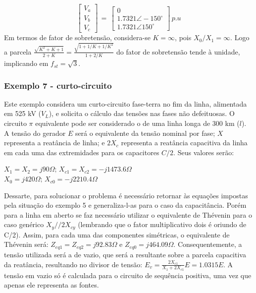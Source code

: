 
\begin{equation} \label{top4:exe6:1}
 \begin{bmatrix} V_a \\ V_b \\ V_c  \end{bmatrix} \,=\, 
 \begin{bmatrix} 0 \\ 1.7321 \angle-150^{\circ} \\ 1.7321 \angle150^{\circ} \end{bmatrix} \, p.u
\end{equation}
Em termos de fator de sobretensão, considera-se $K=\infty$, pois $X_0/X_1=\infty$. Logo a parcela $\frac{\sqrt{K^2+K+1}}{2+K} = \frac{\sqrt{1 + 1/K + 1/K^2}}{1+2/K}$ do fator de sobretensão tende à unidade, implicando em $f_{st} = \sqrt{3}$.

\subsubsection*{Exemplo 7 - curto-circuito}

Este exemplo considera um curto-circuito fase-terra no fim da linha, alimentada em 525 kV ($V_L$), e solicita o cálculo das tensões nas fases não defeituosas. O circuito $\pi$ equivalente pode ser considerado o de uma linha longa de 300 km ($l$). A tensão do gerador $E$ será o equivalente da tensão nominal por fase; $X$ representa a reatância de linha; e $2X_c$ representa a reatância capacitiva da linha em cada uma das extremidades para os capacitores $C/2$. Seus valores serão:
\begin{center}
    $X_1 = X_2 = j90 \Omega; \, X_{c1} = X_{c2} = -j1473.6 \Omega$ \\ \vspace{1pt}
    $X_0 = j420 \Omega; \, X_{c0} = -j2210.4 \Omega$
\end{center}
Dessarte, para solucionar o problema é necessário retornar às equações impostas pela situação do exemplo 5 e generaliza-l-as para o caso da capacitância. Porém para a linha em aberto se faz necessário utilizar o equivalente de Thévenin para o caso genérico $X_y // 2X_{cy}$ (lembrando que o fator multiplicativo dois é oriundo de C/2). Assim, para cada uma das componentes simétricas, o equivalente de Thévenin será: $Z_{eq1} =  Z_{eq2} = j92.83\Omega$ e $Z_{eq0} = j464.09 \Omega$. Consequentemente, a tensão utilizada será a de vazio, que será a resultante sobre a parcela capacitiva da reatância, resultando no divisor de tensão: $E_v = \frac{2X_{c1}}{X_1+2X_{c1}} E = 1.0315E$. A tensão em vazio só é calculada para o circuito de sequência positiva, uma vez que apenas ele representa as fontes.

